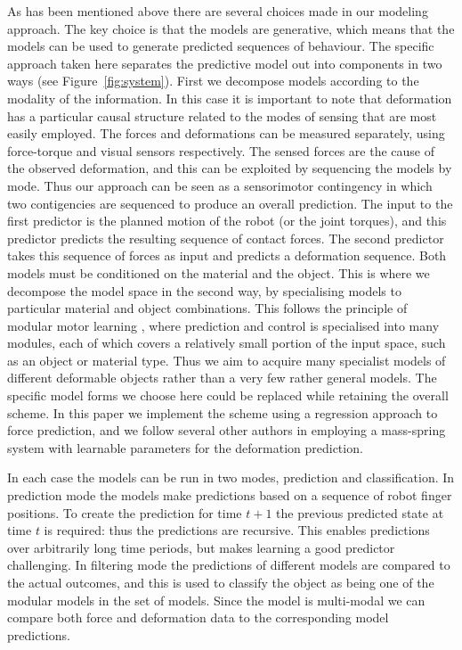 \documentclass[journal]{IEEEtran}
\begin{document}
As has been mentioned above there are several choices made in our modeling approach. The key choice is that the models are generative, which means that the models can be used to generate predicted sequences of behaviour. The specific approach taken here separates the predictive model out into components in two ways (see Figure~\ref{fig:system}). First we decompose models according to the modality of the information. In this case it is important to note that deformation has a particular causal structure related to the modes of sensing that are most easily employed. The forces and deformations can be measured separately, using force-torque and visual sensors respectively. The sensed forces are the cause of the observed deformation, and this can be exploited by sequencing the models by mode. Thus our approach can be seen as a sensorimotor contingency in which two contigencies are sequenced to produce an overall prediction. The input to the first predictor is the planned motion of the robot (or the joint torques), and this predictor predicts the resulting sequence of contact forces. The second predictor takes this sequence of forces as input and predicts a deformation sequence. Both models must be conditioned on the material and the object. This is where we decompose the model space in the second way, by specialising models to particular material and object combinations. This follows the principle of modular motor learning \cite{KopickiICRA11,haruno2001mosaic}, where prediction and control is specialised into many modules, each of which covers a relatively small portion of the input space, such as an object or material type. Thus we aim to acquire many specialist models of different deformable objects rather than a very few rather general models. The specific model forms we choose here could be replaced while retaining the overall scheme. In this paper we implement the scheme using a regression approach to force prediction, and we follow several other authors in employing a mass-spring system with learnable parameters for the deformation prediction.

In each case the models can be run in two modes, prediction and classification. In prediction mode the models make predictions based on a sequence of robot finger positions. To create the prediction for time $t+1$ the previous predicted state at time $t$ is required: thus the predictions are recursive. This enables predictions over arbitrarily long time periods, but makes learning a good predictor challenging. In filtering mode the predictions of different models are compared to the actual outcomes, and this is used to classify the object as being one of the modular models in the set of models. Since the model is multi-modal we can compare both force and deformation data to the corresponding model predictions. 
\end{document}
